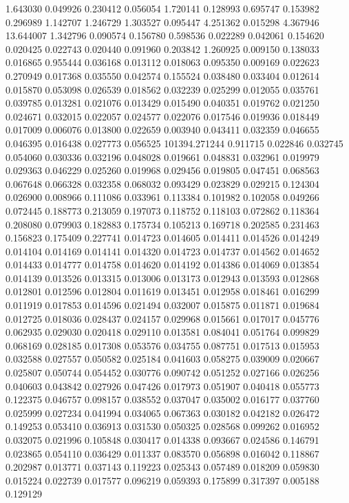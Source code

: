 1.643030
0.049926
0.230412
0.056054
1.720141
0.128993
0.695747
0.153982
0.296989
1.142707
1.246729
1.303527
0.095447
4.251362
0.015298
4.367946
13.644007
1.342796
0.090574
0.156780
0.598536
0.022289
0.042061
0.154620
0.020425
0.022743
0.020440
0.091960
0.203842
1.260925
0.009150
0.138033
0.016865
0.955444
0.036168
0.013112
0.018063
0.095350
0.009169
0.022623
0.270949
0.017368
0.035550
0.042574
0.155524
0.038480
0.033404
0.012614
0.015870
0.053098
0.026539
0.018562
0.032239
0.025299
0.012055
0.035761
0.039785
0.013281
0.021076
0.013429
0.015490
0.040351
0.019762
0.021250
0.024671
0.032015
0.022057
0.024577
0.022076
0.017546
0.019936
0.018449
0.017009
0.006076
0.013800
0.022659
0.003940
0.043411
0.032359
0.046655
0.046395
0.016438
0.027773
0.056525
101394.271244
0.911715
0.022846
0.032745
0.054060
0.030336
0.032196
0.048028
0.019661
0.048831
0.032961
0.019979
0.029363
0.046229
0.025260
0.019968
0.029456
0.019805
0.047451
0.068563
0.067648
0.066328
0.032358
0.068032
0.093429
0.023829
0.029215
0.124304
0.026900
0.008966
0.111086
0.033961
0.113384
0.101982
0.102058
0.049266
0.072445
0.188773
0.213059
0.197073
0.118752
0.118103
0.072862
0.118364
0.208080
0.079903
0.182883
0.175734
0.105213
0.169718
0.202585
0.231463
0.156823
0.175409
0.227741
0.014723
0.014605
0.014411
0.014526
0.014249
0.014104
0.014169
0.014141
0.014320
0.014723
0.014737
0.014562
0.014652
0.014433
0.014777
0.014758
0.014620
0.014192
0.014386
0.014069
0.013854
0.014139
0.013526
0.013315
0.013006
0.013173
0.012943
0.013593
0.012868
0.012801
0.012596
0.012804
0.011619
0.013451
0.012958
0.018461
0.016299
0.011919
0.017853
0.014596
0.021494
0.032007
0.015875
0.011871
0.019684
0.012725
0.018036
0.028437
0.024157
0.029968
0.015661
0.017017
0.045776
0.062935
0.029030
0.020418
0.029110
0.013581
0.084041
0.051764
0.099829
0.068169
0.028185
0.017308
0.053576
0.034755
0.087751
0.017513
0.015953
0.032588
0.027557
0.050582
0.025184
0.041603
0.058275
0.039009
0.020667
0.025807
0.050744
0.054452
0.030776
0.090742
0.051252
0.027166
0.026256
0.040603
0.043842
0.027926
0.047426
0.017973
0.051907
0.040418
0.055773
0.122375
0.046757
0.098157
0.038552
0.037047
0.035002
0.016177
0.037760
0.025999
0.027234
0.041994
0.034065
0.067363
0.030182
0.042182
0.026472
0.149253
0.053410
0.036913
0.031530
0.050325
0.028568
0.099262
0.016952
0.032075
0.021996
0.105848
0.030417
0.014338
0.093667
0.024586
0.146791
0.023865
0.054110
0.036429
0.011337
0.083570
0.056898
0.016042
0.118867
0.202987
0.013771
0.037143
0.119223
0.025343
0.057489
0.018209
0.059830
0.015224
0.022739
0.017577
0.096219
0.059393
0.175899
0.317397
0.005188
0.129129
